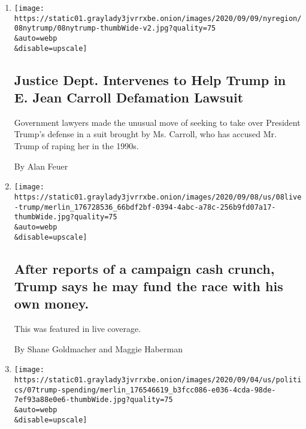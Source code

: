 \begin{enumerate}
\def\labelenumi{\arabic{enumi}.}
\item
  \href{/2020/09/08/nyregion/donald-trump-jean-carroll-lawsuit-rape.html}{}

  \texttt{[image: https://static01.graylady3jvrrxbe.onion/images/2020/09/09/nyregion/08nytrump/08nytrump-thumbWide-v2.jpg?quality=75\\\&auto=webp\\\&disable=upscale]}

  \hypertarget{justice-dept-intervenes-to-help-trump-in-e-jean-carroll-defamation-lawsuit}{%
  \subsection{Justice Dept. Intervenes to Help Trump in E. Jean Carroll
  Defamation
  Lawsuit}\label{justice-dept-intervenes-to-help-trump-in-e-jean-carroll-defamation-lawsuit}}

  Government lawyers made the unusual move of seeking to take over
  President Trump's defense in a suit brought by Ms. Carroll, who has
  accused Mr. Trump of raping her in the 1990s.

  By Alan Feuer
\item
  \href{/live/2020/09/08/us/trump-vs-biden/after-reports-of-a-campaign-cash-crunch-trump-says-he-may-fund-the-race-with-his-own-money}{}

  \texttt{[image: https://static01.graylady3jvrrxbe.onion/images/2020/09/08/us/08live-trump/merlin\_176728536\_66bdf2bf-0394-4abc-a78c-256b9fd07a17-thumbWide.jpg?quality=75\\\&auto=webp\\\&disable=upscale]}

  \hypertarget{after-reports-of-a-campaign-cash-crunch-trump-says-he-may-fund-the-race-with-his-own-money}{%
  \subsection{After reports of a campaign cash crunch, Trump says he may
  fund the race with his own
  money.}\label{after-reports-of-a-campaign-cash-crunch-trump-says-he-may-fund-the-race-with-his-own-money}}

  This was featured in live coverage.

  By Shane Goldmacher and Maggie Haberman
\item
  \href{/2020/09/08/us/elections/the-trump-campaigns-lavish-spending-eroded-its-head-start-a-times-analysis-shows.html}{}

  \texttt{[image: https://static01.graylady3jvrrxbe.onion/images/2020/09/04/us/politics/07trump-spending/merlin\_176546619\_b3fcc086-e036-4cda-98de-7ef93a88e0e6-thumbWide.jpg?quality=75\\\&auto=webp\\\&disable=upscale]}


\end{enumerate}

